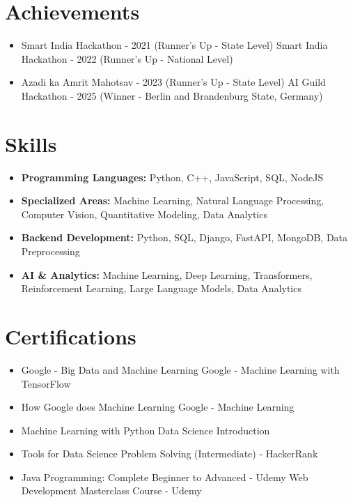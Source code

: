 \documentclass[a4paper,10pt]{article}
\begin{document}
\section*{Achievements}
\begin{itemize}
\item Smart India Hackathon - 2021 (Runner's Up - State Level) \hfill Smart India Hackathon - 2022 (Runner's Up - National Level)
\item Azadi ka Amrit Mahotsav - 2023 (Runner's Up - State Level) \hfill AI Guild Hackathon - 2025 (Winner - Berlin and Brandenburg State, Germany)
\end{itemize}

\section*{Skills}
\begin{itemize}
  \item \textbf{Programming Languages:} Python, C++, JavaScript, SQL, NodeJS
  \item \textbf{Specialized Areas:} Machine Learning, Natural Language Processing, Computer Vision, Quantitative Modeling, Data Analytics
  \item \textbf{Backend Development:} Python, SQL, Django, FastAPI, MongoDB, Data Preprocessing
  \item \textbf{AI \& Analytics:} Machine Learning, Deep Learning, Transformers, Reinforcement Learning, Large Language Models, Data Analytics
\end{itemize}

\section*{Certifications}
\begin{itemize}
\item Google - Big Data and Machine Learning \hfill Google - Machine Learning with TensorFlow
\item How Google does Machine Learning \hfill Google - Machine Learning
\item Machine Learning with Python \hfill Data Science Introduction
\item Tools for Data Science \hfill Problem Solving (Intermediate) - HackerRank
\item Java Programming: Complete Beginner to Advanced - Udemy \hfill Web Development Masterclass Course - Udemy
\end{itemize}
\end{document}
